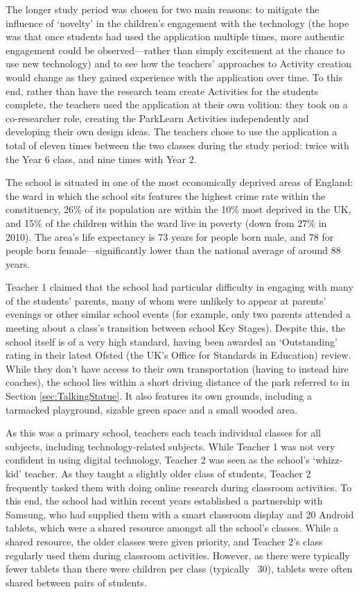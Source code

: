 The longer study period was chosen for two main reasons: to mitigate the influence of `novelty' in the children’s engagement with the technology (the hope was that once students had used the application multiple times, more authentic engagement could be observed---rather than simply excitement at the chance to use new technology) \citep{Sharples2013} and to see how the teachers' approaches to Activity creation would change as they gained experience with the application over time. To this end, rather than have the research team create Activities for the students complete, the teachers used the application at their own volition: they took on a co-researcher role, creating the ParkLearn Activities independently and developing their own design ideas. The teachers chose to use the application a total of eleven times between the two classes during the study period: twice with the Year 6 class, and nine times with Year 2.

The school is situated in one of the most economically deprived areas of England: the ward in which the school sits features the highest crime rate within the constituency, 26\% of its population are within the 10\% most deprived in the UK, and 15\% of the children within the ward live in poverty (down from 27\% in 2010). The area's life expectancy is 73 years for people born male, and 78 for people born female---significantly lower than the national average of around 88 years.

Teacher 1 claimed that the school had particular difficulty in engaging with many of the students' parents, many of whom were unlikely to appear at parents' evenings or other similar school events (for example, only two parents attended a meeting about a class's transition between school Key Stages). Despite this, the school itself is of a very high standard, having been awarded an `Outstanding' rating in their latest Ofsted (the UK’s Office for Standards in Education) review. While they don't have access to their own transportation (having to instead hire coaches), the school lies within a short driving distance of the park referred to in Section \ref{sec:TalkingStatue}. It also features its own grounds, including a tarmacked playground, sizable green space and a small wooded area.

As this was a primary school, teachers each teach individual classes for all subjects, including technology-related subjects. While Teacher 1 was not very confident in using digital technology, Teacher 2 was seen as the school's `whizz-kid' teacher. As they taught a slightly older class of students, Teacher 2 frequently tasked them with doing online research during classroom activities. To this end, the school had within recent years established a partnership with Samsung, who had supplied them with a smart classroom display and 20 Android tablets, which were a shared resource amongst all the school’s classes. While a shared resource, the older classes were given priority, and Teacher 2's class regularly used them during classroom activities. However, as there were typically fewer tablets than there were children per class (typically ~30), tablets were often shared between pairs of students.

